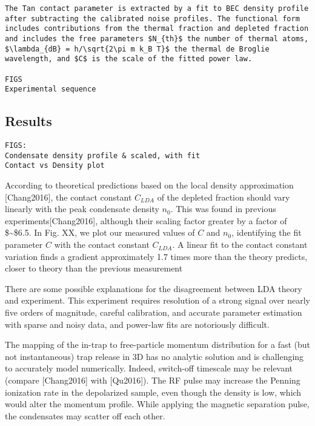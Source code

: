 \begin{verbatim}
The Tan contact parameter is extracted by a fit to BEC density profile after subtracting the calibrated noise profiles. The functional form includes contributions from the thermal fraction and depleted fraction and includes the free parameters $N_{th}$ the number of thermal atoms, $\lambda_{dB} = h/\sqrt{2\pi m k_B T}$ the thermal de Broglie wavelength, and $C$ is the scale of the fitted power law.

FIGS
Experimental sequence
\end{verbatim}

\hypertarget{results}{%
\subsection{Results}\label{results}}

\begin{verbatim}
FIGS:
Condensate density profile & scaled, with fit
Contact vs Density plot
\end{verbatim}

According to theoretical predictions based on the local density
approximation {[}Chang2016{]}, the contact constant \(C_{LDA}\) of the
depleted fraction should vary linearly with the peak condensate density
\(n_0\). This was found in previous experiments{[}Chang2016{]}, although
their scaling factor greater by a factor of \$\sim\$6.5. In Fig. XX, we
plot our measured values of \(C\) and \(n_0\), identifying the fit
parameter \(C\) with the contact constant \(C_{LDA}\). A linear fit to
the contact constant variation finds a gradient approximately 1.7 times
more than the theory predicts, closer to theory than the previous
measurement

There are some possible explanations for the disagreement between LDA
theory and experiment. This experiment requires resolution of a strong
signal over nearly five orders of magnitude, careful calibration, and
accurate parameter estimation with sparse and noisy data, and power-law
fits are notoriously difficult.

The mapping of the in-trap to free-particle momentum distribution for a
fast (but not instantaneous) trap release in 3D has no analytic solution
and is challenging to accurately model numerically. Indeed, switch-off
timescale may be relevant (compare {[}Chang2016{]} with {[}Qu2016{]}).
The RF pulse may increase the Penning ionization rate in the depolarized
sample, even though the density is low, which would alter the momentum
profile. While applying the magnetic separation pulse, the condensates
may scatter off each other.

